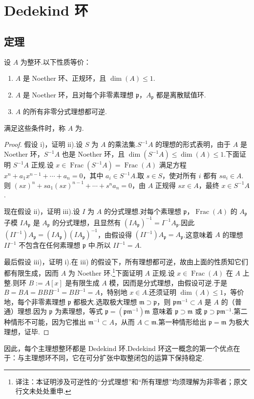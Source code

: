 \section{Dedekind 环}\label{sec:nt-3-3}
\subsection{定理}\label{sec:nt-3-3-1}
\begin{theorem*}
设 $A$ 为整环.以下性质等价：
\begin{enumerate}[label=\roman*)]
\item $A$ 是 Noether 环、正规环，且 $\dim(A)\le1$.
\item $A$ 是 Noether 环，且对每个非零素理想 $\mathfrak p$，$A_{\mathfrak p}$ 都是离散赋值环.
\item $A$ 的所有非零分式理想都可逆.
\end{enumerate}
满足这些条件时，称 $A$ 为.
\end{theorem*}
\begin{proof}
假设 i)，证明 ii).设 $S$ 为 $A$ 的乘法集.$S^{-1}A$ 的理想的形式表明，由于 $A$ 是 Noether 环，$S^{-1}A$ 也是 Noether 环，且 $\dim(S^{-1}A)\le\dim(A)\le1$.下面证明 $S^{-1}A$ 正规.设 $x\in\operatorname{Frac}(S^{-1}A)=\operatorname{Frac}(A)$ 满足方程 $x^n+a_1x^{n-1}+\cdots+a_n=0$，其中 $a_i\in S^{-1}A$.取 $s\in S$，使对所有 $i$ 都有 $sa_i\in A$.则 $(sx)^n+sa_1(sx)^{n-1}+\cdots+s^na_n=0$，由 $A$ 正规得 $sx\in A$，最终 $x\in S^{-1}A$.

现在假设 ii)，证明 iii).设 $I$ 为 $A$ 的分式理想.对每个素理想 $\mathfrak p$，$\operatorname{Frac}(A)$ 的 $A_{\mathfrak p}$ 子模 $IA_{\mathfrak p}$ 是 $A_{\mathfrak p}$ 的分式理想，且显然有 $(IA_{\mathfrak p})^{-1}=I^{-1}A_{\mathfrak p}$.因此 $(II^{-1})A_{\mathfrak p}=(IA_{\mathfrak p})(IA_{\mathfrak p})^{-1}$，由假设得 $(II^{-1})A_{\mathfrak p}=A_{\mathfrak p}$.这意味着 $A$ 的理想 $II^{-1}$ 不包含在任何素理想 $\mathfrak p$ 中.所以 $II^{-1}=A$.

最后假设 iii)，证明 i).在 iii) 的假设下，所有理想都可逆，故由上面的性质知它们都有限生成，因而 $A$ 为 Noether 环.\footnote{译注：本证明涉及可逆性的``分式理想''和``所有理想''均须理解为非零者；原文行文未处处重申.}下面证明 $A$ 正规.设 $x\in\operatorname{Frac}(A)$ 在 $A$ 上整.则环 $B:=A[x]$ 是有限生成 $A$ 模，因而是分式理想，由假设可逆.于是 $B=BA=BBB^{-1}=BB^{-1}=A$，特别地 $x\in A$.还须证明 $\dim(A)\le1$，等价地，每个非零素理想 $\mathfrak p$ 都极大.选取极大理想 $\mathfrak m\supset\mathfrak p$，则 $\mathfrak p\mathfrak m^{-1}\subset A$ 是 $A$ 的（普通）理想.因为 $\mathfrak p$ 为素理想，等式 $\mathfrak p=(\mathfrak p\mathfrak m^{-1})\mathfrak m$ 意味着 $\mathfrak p\supset\mathfrak m$ 或 $\mathfrak p\supset\mathfrak p\mathfrak m^{-1}$.第二种情形不可能，因为它推出 $\mathfrak m^{-1}\subset A$，从而 $A\subset\mathfrak m$.第一种情形给出 $\mathfrak p=\mathfrak m$ 为极大理想，证毕.
\end{proof}
因此，每个主理想整环都是 Dedekind 环.Dedekind 环这一概念的第一个优点在于：与主理想环不同，它在可分扩张中取整闭包的运算下保持稳定.
